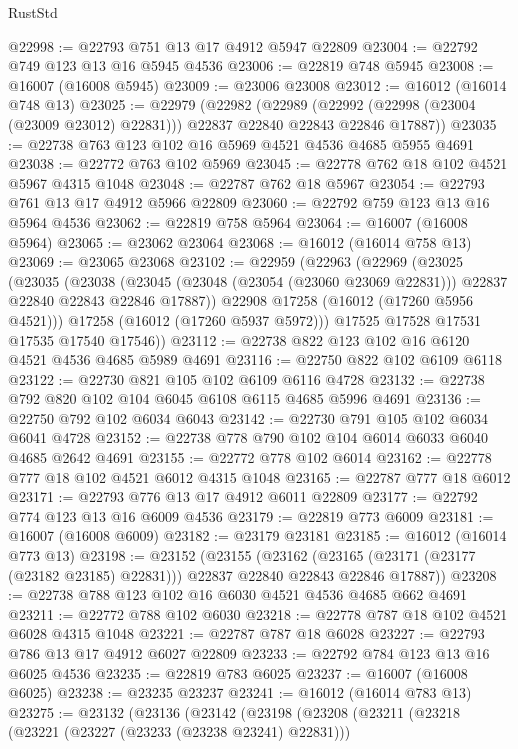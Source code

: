 \begin{lexlean}{RustStd}
\begin{coremodule}
@22998 := @22793 @751 @13 @17 @4912 @5947 @22809
@23004 := @22792 @749 @123 @13 @16 @5945 @4536
@23006 := @22819 @748 @5945
@23008 := @16007 (@16008 @5945)
@23009 := @23006 @23008
@23012 := @16012 (@16014 @748 @13)
@23025 := @22979
    (@22982
      (@22989 (@22992 (@22998 (@23004 (@23009 @23012) @22831))) @22837 @22840 @22843 @22846 @17887))
@23035 := @22738 @763 @123 @102 @16 @5969 @4521 @4536 @4685 @5955 @4691
@23038 := @22772 @763 @102 @5969
@23045 := @22778 @762 @18 @102 @4521 @5967 @4315 @1048
@23048 := @22787 @762 @18 @5967
@23054 := @22793 @761 @13 @17 @4912 @5966 @22809
@23060 := @22792 @759 @123 @13 @16 @5964 @4536
@23062 := @22819 @758 @5964
@23064 := @16007 (@16008 @5964)
@23065 := @23062 @23064
@23068 := @16012 (@16014 @758 @13)
@23069 := @23065 @23068
@23102 := @22959
    (@22963
      (@22969
        (@23025
          (@23035
            (@23038
              (@23045 (@23048 (@23054 (@23060 @23069 @22831))) @22837 @22840 @22843 @22846 @17887))
            @22908
            @17258
            (@16012 (@17260 @5956 @4521)))
          @17258
          (@16012 (@17260 @5937 @5972)))
        @17525
        @17528
        @17531
        @17535
        @17540
        @17546))
@23112 := @22738 @822 @123 @102 @16 @6120 @4521 @4536 @4685 @5989 @4691
@23116 := @22750 @822 @102 @6109 @6118
@23122 := @22730 @821 @105 @102 @6109 @6116 @4728
@23132 := @22738 @792 @820 @102 @104 @6045 @6108 @6115 @4685 @5996 @4691
@23136 := @22750 @792 @102 @6034 @6043
@23142 := @22730 @791 @105 @102 @6034 @6041 @4728
@23152 := @22738 @778 @790 @102 @104 @6014 @6033 @6040 @4685 @2642 @4691
@23155 := @22772 @778 @102 @6014
@23162 := @22778 @777 @18 @102 @4521 @6012 @4315 @1048
@23165 := @22787 @777 @18 @6012
@23171 := @22793 @776 @13 @17 @4912 @6011 @22809
@23177 := @22792 @774 @123 @13 @16 @6009 @4536
@23179 := @22819 @773 @6009
@23181 := @16007 (@16008 @6009)
@23182 := @23179 @23181
@23185 := @16012 (@16014 @773 @13)
@23198 := @23152
    (@23155
      (@23162 (@23165 (@23171 (@23177 (@23182 @23185) @22831))) @22837 @22840 @22843 @22846 @17887))
@23208 := @22738 @788 @123 @102 @16 @6030 @4521 @4536 @4685 @662 @4691
@23211 := @22772 @788 @102 @6030
@23218 := @22778 @787 @18 @102 @4521 @6028 @4315 @1048
@23221 := @22787 @787 @18 @6028
@23227 := @22793 @786 @13 @17 @4912 @6027 @22809
@23233 := @22792 @784 @123 @13 @16 @6025 @4536
@23235 := @22819 @783 @6025
@23237 := @16007 (@16008 @6025)
@23238 := @23235 @23237
@23241 := @16012 (@16014 @783 @13)
@23275 := @23132
    (@23136
      (@23142
        (@23198
          (@23208
            (@23211
              (@23218
                (@23221 (@23227 (@23233 (@23238 @23241) @22831)))

\end{coremodule}
\end{lexlean}
